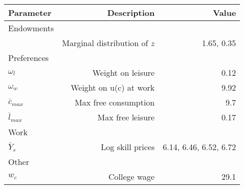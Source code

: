 \begin{tabular}{lrr}
\hline
Parameter & Description  & Value  \\ 
\hline
Endowments &   &   \\ 
 & Marginal distribution of $z$  & 1.65, 0.35  \\ 
Preferences &   &   \\ 
$\omega_{l}$ & Weight on leisure  & 0.12  \\ 
$\omega_{w}$ & Weight on u(c) at work  & 9.92  \\ 
$\bar{c}_{max}$ & Max free consumption  & 9.7  \\ 
$\bar{l}_{max}$ & Max free leisure  & 0.17  \\ 
Work &   &   \\ 
$\bar{Y}_{s}$ & Log skill prices  & 6.14, 6.46, 6.52, 6.72  \\ 
Other &   &   \\ 
$w_{c}$ & College wage  & 29.1  \\ 
\hline
\end{tabular}%
